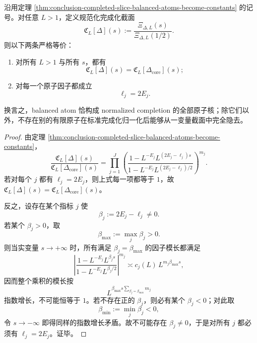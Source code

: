 \begin{theorem}\label{thm:conclusion-completed-slice-normalized-kernel-balanced-atoms}
沿用定理 \ref{thm:conclusion-completed-slice-balanced-atoms-become-constants} 的记号。对任意 \(L>1\)，定义规范化完成化截面
\[
\mathfrak C_L[\Delta](s)
:=
\frac{\Xi_{\Delta,L}(s)}{\Xi_{\Delta,L}(1/2)}.
\]
则以下两条严格等价：
\begin{enumerate}
  \item 对所有 \(L>1\) 与所有 \(s\)，都有
  \[
  \mathfrak C_L[\Delta](s)=\mathfrak C_L[\Delta_{\mathrm{core}}](s);
  \]
  \item 对每一个原子因子都成立
  \[
  \ell_j=2E_j.
  \]
\end{enumerate}
换言之，balanced atom 恰构成 normalized completion 的全部原子核；除它们以外，不存在别的有限原子在标准完成化归一化后能够从一变量截面中完全隐去。
\end{theorem}
\begin{proof}
由定理 \ref{thm:conclusion-completed-slice-balanced-atoms-become-constants}，
\[
\frac{\mathfrak C_L[\Delta](s)}{\mathfrak C_L[\Delta_{\mathrm{core}}](s)}
=
\prod_{j=1}^{J}
\left(
\frac{1-L^{-E_j}L^{(2E_j-\ell_j)s}}
{1-L^{-E_j}L^{(2E_j-\ell_j)/2}}
\right)^{m_j}.
\]
若对每个 \(j\) 都有 \(\ell_j=2E_j\)，则上式每一项都等于 \(1\)，故 \(\mathfrak C_L[\Delta](s)=\mathfrak C_L[\Delta_{\mathrm{core}}](s)\)。

反之，设存在某个指标 \(j\) 使
\[
\beta_j:=2E_j-\ell_j\neq 0.
\]
若某个 \(\beta_j>0\)，取
\[
\beta_{\max}:=\max_j \beta_j>0.
\]
则当实变量 \(s\to+\infty\) 时，所有满足 \(\beta_j=\beta_{\max}\) 的因子模长都满足
\[
\left|
\frac{1-L^{-E_j}L^{\beta_j s}}
{1-L^{-E_j}L^{\beta_j/2}}
\right|^{m_j}
\asymp
c_j(L)\,L^{m_j\beta_{\max}s},
\]
因而整个乘积的模长按
\[
L^{\beta_{\max}s\sum_{\beta_j=\beta_{\max}}m_j}
\]
指数增长，不可能恒等于 \(1\)。若不存在正的 \(\beta_j\)，则必有某个 \(\beta_j<0\)；对此取
\[
\beta_{\min}:=\min_j\beta_j<0,
\]
令 \(s\to-\infty\) 即得同样的指数增长矛盾。故不可能存在 \(\beta_j\neq 0\)，于是对所有 \(j\) 都必须有 \(\ell_j=2E_j\)。证毕。
\end{proof}

